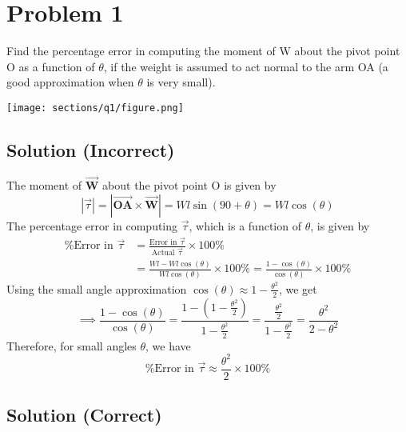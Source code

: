 \section*{Problem 1}

Find the percentage error in computing the moment of W about the pivot point O as a function of \( \theta \), if the weight is assumed to act normal to the arm OA (a good approximation when \( \theta \) is very small).

\begin{figure*}[h]
    \centering
    \texttt{[image: sections/q1/figure.png]}
\end{figure*}

\subsection*{Solution (Incorrect)}

The moment of \( \vec{\mathbf{W}} \) about the pivot point O is given by
\[
    |\vec{\tau}| = |\vec{\mathbf{OA}} \times \vec{\mathbf{W}}|
    = W l \sin(90 + \theta)
    = W l \cos(\theta)
\]
The percentage error in computing \( \vec{\tau} \), which is a function of \( \theta \),  is given by
\begin{align*}
    \text{\%Error in } \vec{\tau}
     & =
    \frac{\text{Error in }\vec{\tau}}{\text{Actual }\vec{\tau}} \times 100\% \\
     & = \frac{W l - W l \cos(\theta)}{W l \cos(\theta)} \times 100\%
    = \frac{1 - \cos(\theta)}{\cos(\theta)} \times 100\%
\end{align*}
Using the small angle approximation \( \cos(\theta) \approx 1 - \frac{\theta^2}{2} \), we get
\[
    \implies \frac{1 - \cos(\theta)}{\cos(\theta)}
    = \frac{1 - (1 - \frac{\theta^2}{2})}{1 - \frac{\theta^2}{2}}
    = \frac{\frac{\theta^2}{2}}{1 - \frac{\theta^2}{2}}
    = \frac{\theta^2}{2 - \theta^2}
\]
Therefore, for small angles \( \theta \), we have
\[
    \boxed{
        \text{\%Error in } \vec{\tau} \approx \frac{\theta^2}{2} \times 100\%
    }
\]

\subsection*{Solution (Correct)}

